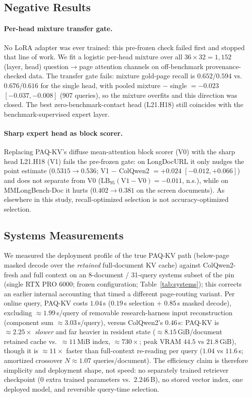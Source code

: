 \documentclass[letterpaper]{article} %
\newcommand{\paqc}{\textsc{PAQ-KV}}
\newcommand{\lb}{\mathrm{LB}_{95}}
\begin{document}
\subsection{Negative Results}\label{sec:results-negatives}

\paragraph{Per-head mixture transfer gate.} No LoRA adapter was ever trained: this pre-frozen check failed first and stopped that line of work. We fit a logistic per-head mixture over all $36{\times}32=1{,}152$ (layer, head) question$\to$page attention channels on off-benchmark provenance-checked data. The transfer gate fails: mixture gold-page recall is $0.652$/$0.594$ vs.\ $0.676$/$0.616$ for the single head, with pooled mixture $-$ single $=-0.023$ $[-0.037,-0.008]$ (907 queries), so the mixture overfits and this direction was closed. The best zero-benchmark-contact head (L21.H18) still coincides with the benchmark-supervised expert layer.

\paragraph{Sharp expert head as block scorer.} Replacing \paqc{}'s diffuse mean-attention block scorer (V0) with the sharp head L21.H18 (V1) fails the pre-frozen gate: on LongDocURL it only nudges the point estimate ($0.5315 \to 0.536$; V1 $-$ ColQwen2 $= +0.024$ $[-0.012,+0.066]$) and does not separate from V0 ($\lb(\mathrm{V1}-\mathrm{V0}) = -0.011$, n.s.), while on MMLongBench-Doc it hurts ($0.402 \to 0.381$ on the screen documents). As elsewhere in this study, recall-optimized selection is not accuracy-optimized selection.

\subsection{Systems Measurements}\label{sec:results-efficiency}
We measured the deployment profile of the true \paqc{} path (below-page masked decode over the \emph{retained} full-document KV cache) against ColQwen2-fresh and full context on an 8-document / 31-query systems subset of the pin (single RTX PRO 6000; frozen configuration; Table~\ref{tab:systems}); this corrects an earlier internal accounting that timed a different page-routing variant. Per online query, \paqc{} costs $1.04$\,s ($0.19$\,s selection $+$ $0.85$\,s masked decode), excluding ${\approx}1.99$\,s/query of removable research-harness input reconstruction (component sum ${\approx}3.03$\,s/query), versus ColQwen2's $0.46$\,s: \paqc{} is ${\approx}2.25\times$ \emph{slower} and far heavier in resident state (${\approx}8.15$\,GiB/document retained cache vs.\ ${\approx}11$\,MiB index, ${\approx}730\times$; peak VRAM $44.5$ vs $21.8$\,GiB), though it is ${\approx}11\times$ faster than full-context re-reading per query ($1.04$ vs $11.6$\,s; amortized crossover $N{\approx}1.07$ queries/document). The efficiency claim is therefore simplicity and deployment shape, not speed: no separately trained retriever checkpoint ($0$ extra trained parameters vs.\ $2.246$\,B), no stored vector index, one deployed model, and reversible query-time selection.
\end{document}
